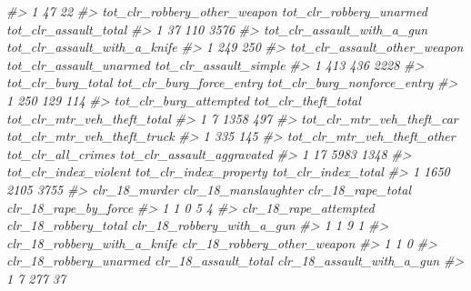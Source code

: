 \documentclass[
  12pt,
]{book}
\newenvironment{Shaded}{\begin{snugshade}}{\end{snugshade}}
\newcommand{\CommentTok}[1]{\textcolor[rgb]{0.37,0.37,0.37}{\textit{#1}}}
\begin{document}
\begin{Shaded}
\begin{Highlighting}[]
\CommentTok{\#\textgreater{} 1                         47                           22}
\CommentTok{\#\textgreater{}   tot\_clr\_robbery\_other\_weapon tot\_clr\_robbery\_unarmed tot\_clr\_assault\_total}
\CommentTok{\#\textgreater{} 1                           37                     110                  3576}
\CommentTok{\#\textgreater{}   tot\_clr\_assault\_with\_a\_gun tot\_clr\_assault\_with\_a\_knife}
\CommentTok{\#\textgreater{} 1                        249                          250}
\CommentTok{\#\textgreater{}   tot\_clr\_assault\_other\_weapon tot\_clr\_assault\_unarmed tot\_clr\_assault\_simple}
\CommentTok{\#\textgreater{} 1                          413                     436                   2228}
\CommentTok{\#\textgreater{}   tot\_clr\_burg\_total tot\_clr\_burg\_force\_entry tot\_clr\_burg\_nonforce\_entry}
\CommentTok{\#\textgreater{} 1                250                      129                         114}
\CommentTok{\#\textgreater{}   tot\_clr\_burg\_attempted tot\_clr\_theft\_total tot\_clr\_mtr\_veh\_theft\_total}
\CommentTok{\#\textgreater{} 1                      7                1358                         497}
\CommentTok{\#\textgreater{}   tot\_clr\_mtr\_veh\_theft\_car tot\_clr\_mtr\_veh\_theft\_truck}
\CommentTok{\#\textgreater{} 1                       335                         145}
\CommentTok{\#\textgreater{}   tot\_clr\_mtr\_veh\_theft\_other tot\_clr\_all\_crimes tot\_clr\_assault\_aggravated}
\CommentTok{\#\textgreater{} 1                          17               5983                       1348}
\CommentTok{\#\textgreater{}   tot\_clr\_index\_violent tot\_clr\_index\_property tot\_clr\_index\_total}
\CommentTok{\#\textgreater{} 1                  1650                   2105                3755}
\CommentTok{\#\textgreater{}   clr\_18\_murder clr\_18\_manslaughter clr\_18\_rape\_total clr\_18\_rape\_by\_force}
\CommentTok{\#\textgreater{} 1             1                   0                 5                    4}
\CommentTok{\#\textgreater{}   clr\_18\_rape\_attempted clr\_18\_robbery\_total clr\_18\_robbery\_with\_a\_gun}
\CommentTok{\#\textgreater{} 1                     1                    9                         1}
\CommentTok{\#\textgreater{}   clr\_18\_robbery\_with\_a\_knife clr\_18\_robbery\_other\_weapon}
\CommentTok{\#\textgreater{} 1                           1                           0}
\CommentTok{\#\textgreater{}   clr\_18\_robbery\_unarmed clr\_18\_assault\_total clr\_18\_assault\_with\_a\_gun}
\CommentTok{\#\textgreater{} 1                      7                  277                        37}

\end{Highlighting}
\end{Shaded}
\end{document}
